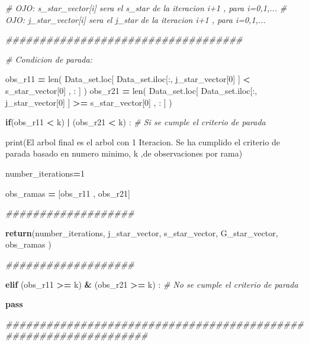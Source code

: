 \documentclass[
  11pt,
  a4paper,
]{article}
\newenvironment{Shaded}{\begin{snugshade}}{\end{snugshade}}
\newcommand{\BuiltInTok}[1]{#1}
\newcommand{\CommentTok}[1]{\textcolor[rgb]{0.56,0.35,0.01}{\textit{#1}}}
\newcommand{\ControlFlowTok}[1]{\textcolor[rgb]{0.13,0.29,0.53}{\textbf{#1}}}
\newcommand{\DecValTok}[1]{\textcolor[rgb]{0.00,0.00,0.81}{#1}}
\newcommand{\NormalTok}[1]{#1}
\newcommand{\OperatorTok}[1]{\textcolor[rgb]{0.81,0.36,0.00}{\textbf{#1}}}
\newcommand{\StringTok}[1]{\textcolor[rgb]{0.31,0.60,0.02}{#1}}
\begin{document}
\begin{Shaded}
\begin{Highlighting}[]
        \CommentTok{\# OJO: s\_star\_vector[i] sera el s\_star de la iteracion i+1 , para i=0,1,...}
        \CommentTok{\# OJO: j\_star\_vector[i] sera el j\_star de la iteracion i+1 , para i=0,1,...    }
        
      \CommentTok{\#\#\#\#\#\#\#\#\#\#\#\#\#\#\#\#\#\#\#\#\#\#\#\#\#\#\#\#\#\#\#\#\#\#\#}

        \CommentTok{\# Condicion de parada:}

\NormalTok{        obs\_r11 }\OperatorTok{=} \BuiltInTok{len}\NormalTok{( Data\_set.loc[ Data\_set.iloc[:, j\_star\_vector[}\DecValTok{0}\NormalTok{] ] }\OperatorTok{\textless{}}\NormalTok{ s\_star\_vector[}\DecValTok{0}\NormalTok{] , : ] )}
\NormalTok{        obs\_r21 }\OperatorTok{=} \BuiltInTok{len}\NormalTok{( Data\_set.loc[ Data\_set.iloc[:, j\_star\_vector[}\DecValTok{0}\NormalTok{] ] }\OperatorTok{\textgreater{}=}\NormalTok{ s\_star\_vector[}\DecValTok{0}\NormalTok{] , : ] )}

        \ControlFlowTok{if}\NormalTok{(obs\_r11 }\OperatorTok{\textless{}}\NormalTok{ k) }\OperatorTok{|}\NormalTok{ (obs\_r21 }\OperatorTok{\textless{}}\NormalTok{ k) : }\CommentTok{\# Si se cumple el criterio de parada}


            \BuiltInTok{print}\NormalTok{(}\StringTok{\textquotesingle{}El arbol final es el arbol con 1 Iteracion. Se ha cumplido el criterio de parada basado en numero minimo\textquotesingle{}}\NormalTok{, k ,}\StringTok{\textquotesingle{}de observaciones por rama\textquotesingle{}}\NormalTok{)}

\NormalTok{            number\_iterations}\OperatorTok{=}\DecValTok{1}

\NormalTok{            obs\_ramas }\OperatorTok{=}\NormalTok{ [obs\_r11 , obs\_r21]}

       
            \CommentTok{\#\#\#\#\#\#\#\#\#\#\#\#\#\#\#\#\#\#\#}
            
            \ControlFlowTok{return}\NormalTok{(number\_iterations, j\_star\_vector, s\_star\_vector, G\_star\_vector, obs\_ramas ) }

            \CommentTok{\#\#\#\#\#\#\#\#\#\#\#\#\#\#\#\#\#\#\#}

        \ControlFlowTok{elif}\NormalTok{ (obs\_r11 }\OperatorTok{\textgreater{}=}\NormalTok{ k) }\OperatorTok{\&}\NormalTok{ (obs\_r21 }\OperatorTok{\textgreater{}=}\NormalTok{ k) : }\CommentTok{\# No se cumple el criterio de parada}

            \ControlFlowTok{pass}


\CommentTok{\#\#\#\#\#\#\#\#\#\#\#\#\#\#\#\#\#\#\#\#\#\#\#\#\#\#\#\#\#\#\#\#\#\#\#\#\#\#\#\#\#\#\#\#\#\#\#\#\#\#\#\#\#\#\#\#\#\#\#\#\#\#\#\#\#}


\end{Highlighting}
\end{Shaded}
\end{document}
